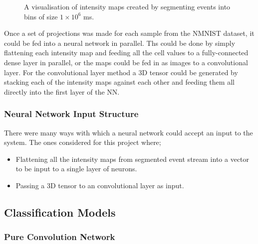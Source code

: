 \begin{figure}[htb]
    \caption{A visualisation of intensity maps created by segmenting events into bins of size $ 1 \times 10^6 $ ms.}%
    \label{fig:nmnist_spikes_to_intensity_map}%
\end{figure}

Once a set of projections was made for each sample from the NMNIST dataset, it could be fed into a neural network in parallel. Ths could be done by simply flattening each intensity map and feeding all the cell values to a fully-connected dense layer in parallel, or the maps could be fed in as images to a convolutional layer. For the convolutional layer method a 3D tensor could be generated by stacking each of the intensity maps against each other and feeding them all directly into the first layer of the NN.

\subsubsection{Neural Network Input Structure}

There were many ways with which a neural network could accept an input to the system. The ones considered for this project where;

\begin{itemize}
    \item Flattening all the intensity maps from segmented event stream into a vector to be input to a single layer of neurons.
    \item Passing a 3D tensor to an convolutional layer as input.
\end{itemize}

\subsection{Classification Models}

\subsubsection{Pure Convolution Network}

